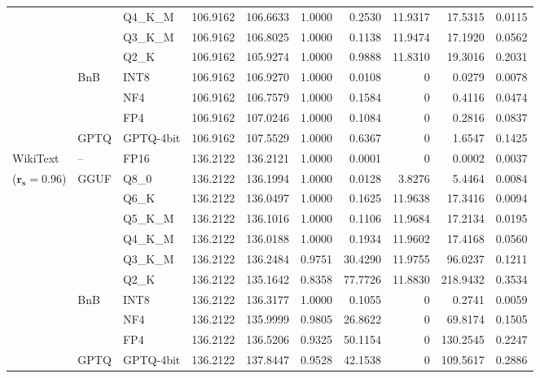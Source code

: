 \begin{longtable}{ll l rrrrrrr}
 &  & Q4\_K\_M & 106.9162 & 106.6633 & 1.0000 & 0.2530 & 11.9317 & 17.5315 & 0.0115 \\
 &  & Q3\_K\_M & 106.9162 & 106.8025 & 1.0000 & 0.1138 & 11.9474 & 17.1920 & 0.0562 \\
 &  & Q2\_K & 106.9162 & 105.9274 & 1.0000 & 0.9888 & 11.8310 & 19.3016 & 0.2031 \\
 & BnB & INT8 & 106.9162 & 106.9270 & 1.0000 & 0.0108 & \cellcolor{cyan!12} $0$ & 0.0279 & 0.0078 \\
 &  & NF4 & 106.9162 & 106.7579 & 1.0000 & 0.1584 & \cellcolor{cyan!12} $0$ & 0.4116 & 0.0474 \\
 &  & FP4 & 106.9162 & 107.0246 & 1.0000 & 0.1084 & \cellcolor{cyan!12} $0$ & 0.2816 & 0.0837 \\
 & GPTQ & GPTQ-4bit & 106.9162 & 107.5529 & 1.0000 & 0.6367 & \cellcolor{cyan!12} $0$ & 1.6547 & 0.1425 \\
\midrule
WikiText & -- & FP16 & 136.2122 & 136.2121 & 1.0000 & 0.0001 & \cellcolor{cyan!12} $0$ & 0.0002 & 0.0037 \\
{\small ($\mathbf{r_s{=}0.96}$)} & GGUF & Q8\_0 & 136.2122 & 136.1994 & 1.0000 & 0.0128 & 3.8276 & 5.4464 & 0.0084 \\
 &  & Q6\_K & 136.2122 & 136.0497 & 1.0000 & 0.1625 & 11.9638 & 17.3416 & 0.0094 \\
 &  & Q5\_K\_M & 136.2122 & 136.1016 & 1.0000 & 0.1106 & 11.9684 & 17.2134 & 0.0195 \\
 &  & Q4\_K\_M & 136.2122 & 136.0188 & 1.0000 & 0.1934 & 11.9602 & 17.4168 & 0.0560 \\
 &  & Q3\_K\_M & 136.2122 & 136.2484 & 0.9751 & 30.4290 & 11.9755 & 96.0237 & 0.1211 \\
 &  & Q2\_K & 136.2122 & 135.1642 & \cellcolor{red!18} 0.8358 & \cellcolor{red!18} 77.7726 & 11.8830 & \cellcolor{red!18} 218.9432 & \cellcolor{red!18} 0.3534 \\
 & BnB & INT8 & 136.2122 & 136.3177 & 1.0000 & 0.1055 & \cellcolor{cyan!12} $0$ & 0.2741 & 0.0059 \\
 &  & NF4 & 136.2122 & 135.9999 & 0.9805 & 26.8622 & \cellcolor{cyan!12} $0$ & 69.8174 & 0.1505 \\
 &  & FP4 & 136.2122 & 136.5206 & \cellcolor{red!18} 0.9325 & \cellcolor{red!18} 50.1154 & \cellcolor{cyan!12} $0$ & \cellcolor{red!18} 130.2545 & \cellcolor{red!18} 0.2247 \\
 & GPTQ & GPTQ-4bit & 136.2122 & 137.8447 & 0.9528 & 42.1538 & \cellcolor{cyan!12} $0$ & 109.5617 & 0.2886 \\
\end{longtable}
\endgroup
